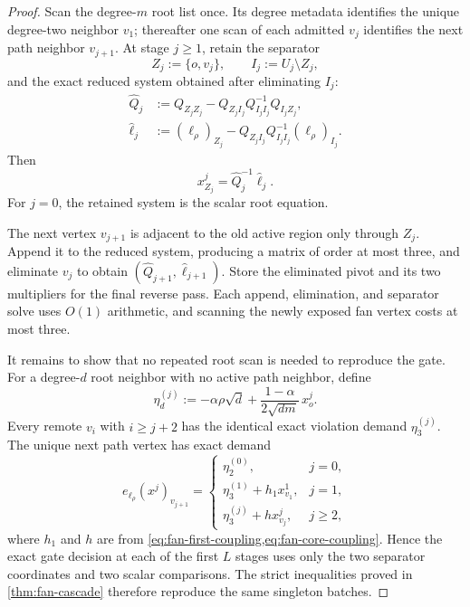 \begin{proof}
Scan the degree-$m$ root list once.  Its degree metadata identifies the unique
degree-two neighbor $v_1$; thereafter one scan of each admitted $v_j$
identifies the next path neighbor $v_{j+1}$.  At stage $j\geq1$, retain the
separator
\begin{equation}
 Z_j:=\{o,v_j\},
 \qquad
 I_j:=U_j\setminus Z_j,
 \label{eq:fan-separator}
\end{equation}
and the exact reduced system obtained after eliminating $I_j$:
\begin{align}
 \widehat Q_j
 &:=
 Q_{Z_jZ_j}
 -Q_{Z_jI_j}Q_{I_jI_j}^{-1}Q_{I_jZ_j},
 \label{eq:fan-reduced-matrix}\\
 \widehat\ell_j
 &:=
 (\ell_\rho)_{Z_j}
 -Q_{Z_jI_j}Q_{I_jI_j}^{-1}(\ell_\rho)_{I_j}.
 \label{eq:fan-reduced-load}
\end{align}
Then
\begin{equation}
 x^j_{Z_j}=\widehat Q_j^{-1}\widehat\ell_j.
 \label{eq:fan-separator-solution}
\end{equation}
For $j=0$, the retained system is the scalar root equation.

The next vertex $v_{j+1}$ is adjacent to the old active region only through
$Z_j$.  Append it to the reduced system, producing a matrix of order at most
three, and eliminate $v_j$ to obtain
$(\widehat Q_{j+1},\widehat\ell_{j+1})$.  Store the eliminated pivot and its
two multipliers for the final reverse pass.  Each append, elimination, and
separator solve uses $O(1)$ arithmetic, and scanning the newly exposed fan
vertex costs at most three.

It remains to show that no repeated root scan is needed to reproduce the
gate.  For a degree-$d$ root neighbor with no active path neighbor, define
\begin{equation}
 \eta_d^{(j)}
 :=
 -\alpha\rho\sqrt d
 +\frac{1-\alpha}{2\sqrt{dm}}\,x_o^j.
 \label{eq:fan-live-remote-demand}
\end{equation}
Every remote $v_i$ with $i\geq j+2$ has the identical exact violation demand
$\eta_3^{(j)}$.  The unique next path vertex has exact demand
\begin{equation}
 e_{\ell_\rho}(x^j)_{v_{j+1}}
 =
 \begin{cases}
  \eta_2^{(0)},&j=0,\\
  \eta_3^{(1)}+h_1x_{v_1}^1,&j=1,\\
  \eta_3^{(j)}+hx_{v_j}^j,&j\geq2,
 \end{cases}
 \label{eq:fan-live-next-demand}
\end{equation}
where $h_1$ and $h$ are from
\cref{eq:fan-first-coupling,eq:fan-core-coupling}.  Hence the exact gate
decision at each of the first $L$ stages uses only the two separator
coordinates and two scalar comparisons.  The strict inequalities proved in
\cref{thm:fan-cascade} therefore reproduce the same singleton batches.


\end{proof}
